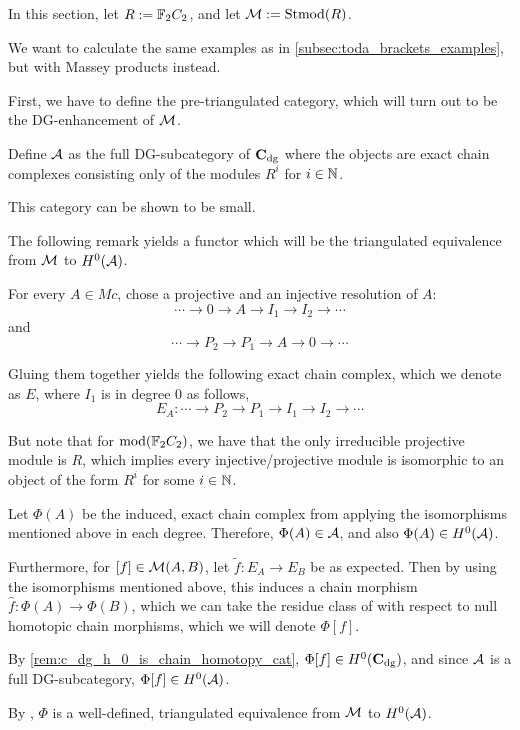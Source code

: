 In this section, let \( R := {\mathbb{F}}_2 C_2 \), and let \( {\mathcal{M}} := \operatorname{Stmod}(R) \).

We want to calculate the same examples as in \autoref{subsec:toda_brackets_examples}, but with Massey products instead.

First, we have to define the pre-triangulated category, which will turn out to be the DG-enhancement of \( {\mathcal{M}} \).

\begin{definition}
    Define \( {\mathcal{A}} \) as the full DG-subcategory of \( \operatorname{\mathbf{C}}_{\operatorname{dg}} \) where the objects are exact chain complexes consisting only of the modules \( R^i \) for \( i \in {\mathbb{N}} \).
\end{definition}

This category can be shown to be small.

The following remark yields a functor which will be the triangulated equivalence from \( {\mathcal{M}} \) to \( H^0({\mathcal{A}}) \).

\begin{remark}
    For every \( A \in Mc \), chose a projective and an injective resolution of \( A \):
    \[
        \cdots \to 0 \to A \to I_1 \to I_2 \to \cdots
    \]
    and
    \[
        \cdots \to P_2 \to P_1 \to A \to 0 \to \cdots
    \]

    Gluing them together yields the following exact chain complex, which we denote as \( E \), where \( I_1 \) is in degree \( 0 \) as follows,
    \[
        E_A: \cdots \to P_2 \to P_1 \to I_1 \to I_2 \to \cdots
    \]

    But note that for \( \operatorname{mod}({\mathbb{F}}_2 C_2) \), we have that the only irreducible projective module is \( R \), which implies every injective/projective module is isomorphic to an object of the form \( R^i \) for some \( i \in {\mathbb{N}} \).

    Let \( \Phi(A) \) be the induced, exact chain complex from applying the isomorphisms mentioned above in each degree. Therefore, \( \Phi(A) \in {\mathcal{A}} \), and also \( \Phi(A) \in H^0({\mathcal{A}}) \).

    Furthermore, for \( [f] \in {\mathcal{M}}(A, B) \), let \( \tilde{f}: E_A \to E_B \) be as expected. Then by using the isomorphisms mentioned above, this induces a chain morphism \( \hat{f}: \Phi(A) \to \Phi(B) \), which we can take the residue class of with respect to null homotopic chain morphisms, which we will denote \( \Phi[f] \).

    By \autoref{rem:c_dg_h_0_is_chain_homotopy_cat}, \( \Phi[f] \in H^0(\operatorname{\mathbf{C}}_{\operatorname{dg}}) \), and since \( {\mathcal{A}} \) is a full DG-subcategory, \( \Phi[f] \in H^0({\mathcal{A}}) \).

    By \cite[Section 7.5]{Krause_2007}, \( \Phi \) is a well-defined, triangulated equivalence from \( {\mathcal{M}} \) to \( H^0({\mathcal{A}}) \).
\end{remark}


